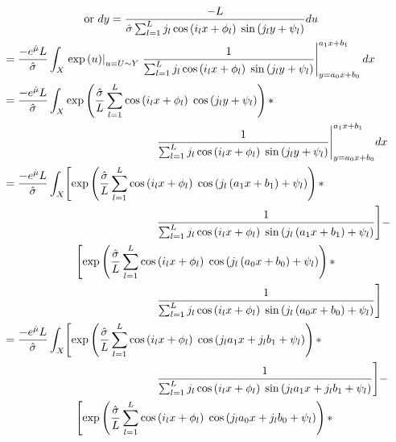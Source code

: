 \documentclass[12pt,dvipsnames]{report}
\begin{document}
\begin{align}
& \hspace{1in} \text{or $dy = \frac{-L}{\hat{\sigma} \sum_{l=1}^L j_l \cos\left( i_l x + \phi_l \right) \; \sin\left( j_l y + \psi_l \right)} du$} \nonumber \\
&= \frac{-e^{\hat{\mu}} L}{\hat{\sigma}} \int_X \left. \exp\left( u \right) \right\rvert_{u = U \sim Y} \left. \frac{1}{\sum_{l=1}^L j_l \cos\left( i_l x + \phi_l \right) \; \sin\left( j_l y + \psi_l \right)} \right\rvert_{y = a_0 x + b_0}^{a_1 x + b_1} dx \\
&= \frac{-e^{\hat{\mu}} L}{\hat{\sigma}} \int_X \exp\left( \frac{\hat{\sigma}}{L} \sum_{l=1}^L \cos\left( i_l x + \phi_l \right) \; \cos\left( j_l y + \psi_l \right) \right) * \nonumber \\
& \hspace{1.9in} \frac{1}{\sum_{l=1}^L j_l \cos\left( i_l x + \phi_l \right) \; \sin\left( j_l y + \psi_l \right)} \Biggr\rvert_{y = a_0 x + b_0}^{a_1 x + b_1} dx \\
&= \frac{-e^{\hat{\mu}} L}{\hat{\sigma}} \int_X \Biggl[ \exp\left( \frac{\hat{\sigma}}{L} \sum_{l=1}^L \cos\left( i_l x + \phi_l \right) \; \cos\left( j_l \left( a_1 x + b_1 \right) + \psi_l \right) \right) * \nonumber \\
& \hspace{1.9in} \frac{1}{\sum_{l=1}^L j_l \cos\left( i_l x + \phi_l \right) \; \sin\left( j_l \left( a_1 x + b_1 \right) + \psi_l \right)} \Biggr] - \nonumber \\
& \hspace{0.9in} \Biggl[ \exp\left( \frac{\hat{\sigma}}{L} \sum_{l=1}^L \cos\left( i_l x + \phi_l \right) \; \cos\left( j_l \left( a_0 x + b_0 \right) + \psi_l \right) \right) * \nonumber \\
& \hspace{1.9in} \frac{1}{\sum_{l=1}^L j_l \cos\left( i_l x + \phi_l \right) \; \sin\left( j_l \left( a_0 x + b_0 \right) + \psi_l \right)} \Biggr] \\
&= \frac{-e^{\hat{\mu}} L}{\hat{\sigma}} \int_X \Biggl[ \exp\left( \frac{\hat{\sigma}}{L} \sum_{l=1}^L \cos\left( i_l x + \phi_l \right) \; \cos\left( j_l a_1 x + j_l b_1 + \psi_l \right) \right) * \nonumber \\
& \hspace{1.9in} \frac{1}{\sum_{l=1}^L j_l \cos\left( i_l x + \phi_l \right) \; \sin\left( j_l a_1 x + j_l b_1 + \psi_l \right)} \Biggr] - \nonumber \\
& \hspace{0.9in} \Biggl[ \exp\left( \frac{\hat{\sigma}}{L} \sum_{l=1}^L \cos\left( i_l x + \phi_l \right) \; \cos\left( j_l a_0 x + j_l b_0 + \psi_l \right) \right) * \nonumber \\

\end{align}
\end{document}
